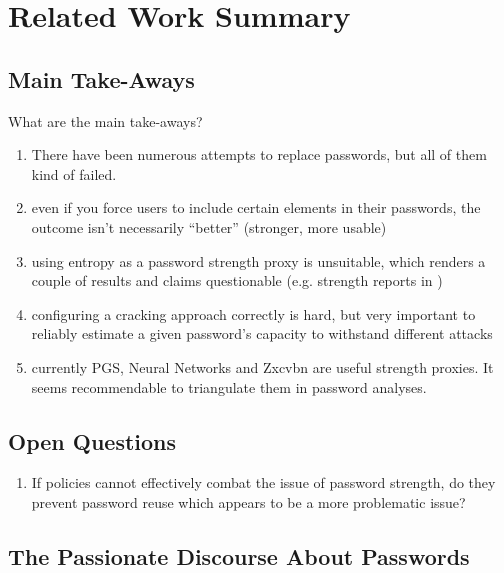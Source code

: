 
\chapter[Related Work Summary]{Related Work Summary}\label{chap:rw:summary}


\section{Main Take-Aways}
What are the main take-aways?

\begin{enumerate}
	\item There have been numerous attempts to replace passwords, but all of them kind of failed.
	\item even if you force users to include certain elements in their passwords, the outcome isn't necessarily ``better'' (stronger, more usable)
	\item using entropy as a password strength proxy is unsuitable, which renders a couple of results and claims questionable (e.g. strength reports in \cite{Florencio2007LargeScaleStudyPasswordHabits})
	\item configuring a cracking approach correctly is hard, but very important to reliably estimate a given password's capacity to withstand different attacks \cite{Bonneau2012ScienceOfGuessing, Kelley2012GuessAgain, Ur2015MeasuringRealWorldAccuracies, Weir2009PCFG}
	\item currently PGS, Neural Networks and Zxcvbn are useful strength proxies. It seems recommendable to triangulate them in password analyses.  
\end{enumerate}

\section{Open Questions}
\begin{enumerate}
\item If policies cannot effectively combat the issue of password strength, do they prevent password reuse which appears to be a more problematic issue? 
\end{enumerate}

\section{The Passionate Discourse About Passwords}\label{sec:rw:passionate_discourse}

